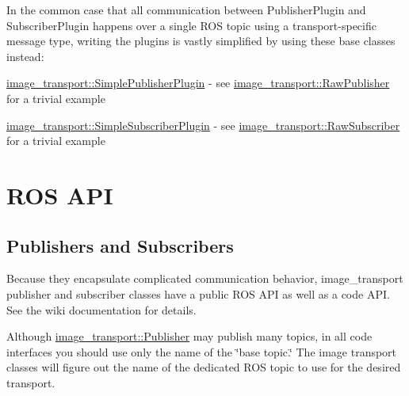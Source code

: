 In the common case that all communication between Publisher\-Plugin and Subscriber\-Plugin happens over a single R\-O\-S topic using a transport-\/specific message type, writing the plugins is vastly simplified by using these base classes instead\-:
\begin{DoxyItemize}
\item \hyperlink{classimage__transport_1_1_simple_publisher_plugin}{image\-\_\-transport\-::\-Simple\-Publisher\-Plugin} -\/ see \hyperlink{classimage__transport_1_1_raw_publisher}{image\-\_\-transport\-::\-Raw\-Publisher} for a trivial example
\item \hyperlink{classimage__transport_1_1_simple_subscriber_plugin}{image\-\_\-transport\-::\-Simple\-Subscriber\-Plugin} -\/ see \hyperlink{classimage__transport_1_1_raw_subscriber}{image\-\_\-transport\-::\-Raw\-Subscriber} for a trivial example
\end{DoxyItemize}\hypertarget{index_rosapi}{}\section{R\-O\-S A\-P\-I}\label{index_rosapi}
\hypertarget{index_pub_sub_rosapi}{}\subsection{Publishers and Subscribers}\label{index_pub_sub_rosapi}
Because they encapsulate complicated communication behavior, image\-\_\-transport publisher and subscriber classes have a public R\-O\-S A\-P\-I as well as a code A\-P\-I. See the wiki documentation for details.

Although \hyperlink{classimage__transport_1_1_publisher}{image\-\_\-transport\-::\-Publisher} may publish many topics, in all code interfaces you should use only the name of the \char`\"{}base topic.\char`\"{} The image transport classes will figure out the name of the dedicated R\-O\-S topic to use for the desired transport. 